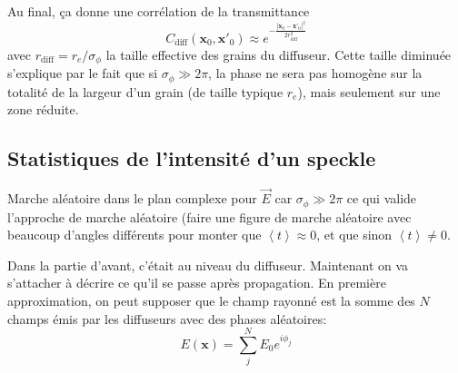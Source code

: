Au final, ça donne une corrélation de la transmittance 
\begin{equation}
C_{\mathrm{diff}}(\mathbf{x}_0,\mathbf{x}'_0)\approx e^{-\frac{\left| \mathbf{x}_0 - \mathbf{x}'_0 \right| ^2}{2 r_{\mathrm{diff}}^2}}
\end{equation}
avec $r_{\mathrm{diff}} = r_e / \sigma_{\phi}$ la taille effective des grains du diffuseur. Cette taille diminuée s'explique par le fait que si $\sigma_{\phi} \gg 2\pi$, la phase ne sera pas homogène sur la totalité de la largeur d'un grain (de taille typique $r_e$), mais seulement sur une zone réduite. 




\subsection{Statistiques de l'intensité d'un speckle}
Marche aléatoire dans le plan complexe pour $\vec{E}$ car $\sigma_{\phi} \gg 2\pi$ ce qui valide l'approche de marche aléatoire (faire une figure de marche aléatoire avec beaucoup d'angles différents pour monter que $\left\langle t \right\rangle\approx 0$, et que sinon $\left\langle t \right\rangle\neq 0$.

Dans la partie d'avant, c'était au niveau du diffuseur. Maintenant on va s'attacher à décrire ce qu'il se passe après propagation. 
En première approximation, on peut supposer que le champ rayonné est la somme des $N$ champs émis par les diffuseurs avec des phases aléatoires:
\begin{equation}
E(\mathbf{x})=\sum_{j}^{N} E_0 e^{i \phi_j}
\end{equation}

